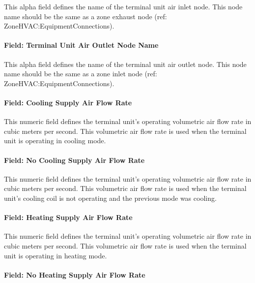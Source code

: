 This alpha field defines the name of the terminal unit air inlet node. This node name should be the same as a zone exhaust node (ref: ZoneHVAC:EquipmentConnections).

\paragraph{Field: Terminal Unit Air Outlet Node Name}\label{field-terminal-unit-air-outlet-node-name}

This alpha field defines the name of the terminal unit air outlet node. This node name should be the same as a zone inlet node (ref: ZoneHVAC:EquipmentConnections).

\paragraph{Field: Cooling Supply Air Flow Rate}\label{field-cooling-supply-air-flow-rate-3-001}

This numeric field defines the terminal unit's operating volumetric air flow rate in cubic meters per second. This volumetric air flow rate is used when the terminal unit is operating in cooling mode.

\paragraph{Field: No Cooling Supply Air Flow Rate}\label{field-no-cooling-supply-air-flow-rate-000}

This numeric field defines the terminal unit's operating volumetric air flow rate in cubic meters per second. This volumetric air flow rate is used when the terminal unit's cooling coil is not operating and the previous mode was cooling.

\paragraph{Field: Heating Supply Air Flow Rate}\label{field-heating-supply-air-flow-rate-3-001}

This numeric field defines the terminal unit's operating volumetric air flow rate in cubic meters per second. This volumetric air flow rate is used when the terminal unit is operating in heating mode.

\paragraph{Field: No Heating Supply Air Flow Rate}\label{field-no-heating-supply-air-flow-rate-000}

